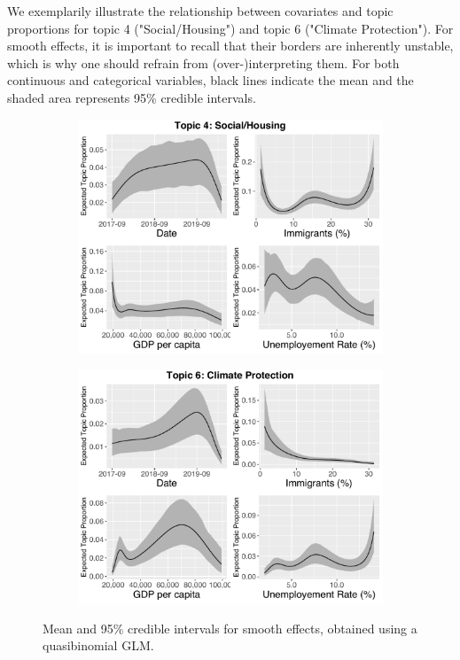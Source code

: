We exemplarily illustrate the relationship between covariates and topic proportions for topic 4 ("Social/Housing") and topic 6 ("Climate Protection"). For smooth effects, it is important to recall that their borders are inherently unstable, which is why one should refrain from (over-)interpreting them. For both continuous and categorical variables, black lines indicate the mean and the shaded area represents 95\% credible intervals.

\begin{figure}[h!]
  \centering
  \captionsetup{justification=centering,margin=2cm}
  \begin{subfigure}[b]{0.49\linewidth}
    \includegraphics[width=\linewidth]{../plots/5_1/quasi_t4_cont.pdf}
  \end{subfigure}
  \begin{subfigure}[b]{0.49\linewidth}
    \includegraphics[width=\linewidth]{../plots/5_1/quasi_t6_cont.pdf}
  \end{subfigure}
  \caption{Mean and 95\% credible intervals for smooth effects, obtained using a quasibinomial GLM.}
  \label{fig:quasi_t46_cont}
\end{figure}

